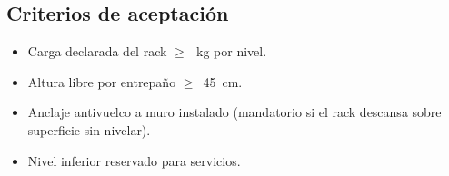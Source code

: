 \subsection{Criterios de aceptación}
\label{sec:rack:aceptacion}

\begin{itemize}[leftmargin=*,itemsep=0pt]
  \item Carga declarada del rack $\geq$~\paramCargaUtilNivel{}\,kg por
        nivel.
  \item Altura libre por entrepaño $\geq$~\SI{45}{\centi\meter}.
  \item Anclaje antivuelco a muro instalado (mandatorio si el rack
        descansa sobre superficie sin nivelar).
  \item Nivel inferior reservado para servicios.
\end{itemize}
